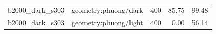 \begin{longtable}{l>{\raggedright\arraybackslash}p{.42\linewidth}rrr}
b2000\_\allowbreak{}dark\_\allowbreak{}s303 & %
geometry:phuong/dark & %
400 & %
85.75 & %
99.48 \\ %

b2000\_\allowbreak{}dark\_\allowbreak{}s303 & %
geometry:phuong/light & %
400 & %
0.00 & %
56.14 \\ %


\end{longtable}
